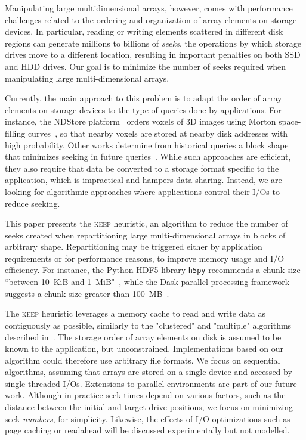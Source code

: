 \documentclass[sigconf, nonacm]{acmart}
\newcommand{\keep}[0]{\textsc{keep}\xspace}
\begin{document}
Manipulating large multidimensional arrays, however, comes with performance
challenges related to the ordering and organization of array elements on
storage devices. In particular, reading or writing elements scattered in different
disk regions can generate millions to billions of \emph{seeks}, the
operations by which storage drives move to a different location, resulting
in important penalties on both SSD and HDD drives. Our goal is to minimize the number of seeks required when manipulating
large multi-dimensional arrays.

Currently, the main approach to this problem is to adapt the order of array
elements on storage devices to the type of queries done by applications.
For instance, the NDStore platform~\cite{lillaney2018building} orders voxels of 3D images
using Morton space-filling curves~\cite{morton1966computer}, so that nearby
voxels are stored at nearby disk addresses with high
probability. Other works determine from historical queries a
block shape that minimizes seeking
in future queries~\cite{optimal_chuking}.
While such approaches are efficient, they also require that data
be converted to a storage format specific to the application, which is
impractical and hampers data sharing. Instead, we are looking for
algorithmic approaches where applications control their I/Os to reduce seeking.

This paper presents the \keep heuristic, an algorithm to reduce the
number of seeks created when repartitioning large multi-dimensional arrays in blocks of
arbitrary shape. Repartitioning may be triggered either by application requirements
 or for performance reasons, to improve
memory usage and I/O efficiency. For instance, the Python HDF5 library
\texttt{h5py} recommends a chunk size ``between 10~KiB and 1~MiB"~\cite{collette_2014}, while the Dask parallel processing framework
~\cite{matthew_rocklin-proc-scipy-2015} suggests a chunk size greater than
100~MB~\cite{rocklin_bourbeau_2019}.

The \keep heuristic leverages a memory cache to read and write data as
contiguously as possible, similarly to the "clustered" and "multiple"
algorithms described in~\cite{seqalgorithms}. The storage order of array
elements on disk is assumed to be known to the application, but unconstrained.
Implementations based on our algorithm could therefore use arbitrary file
formats. We focus on sequential algorithms, assuming that arrays are stored
on a single device and accessed by single-threaded I/Os. Extensions to parallel
environments are part of our future work. Although in practice seek times
depend on various factors, such as the distance between the initial and
target drive positions, we focus on minimizing seek \emph{numbers}, for
simplicity. Likewise, the effects of I/O optimizations such as page caching
or readahead will be discussed experimentally but not modelled.
\end{document}
